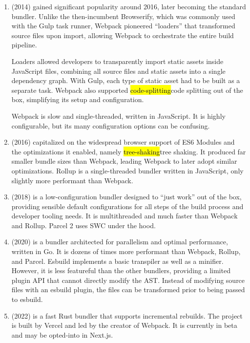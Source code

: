 \documentclass{article}
\begin{document}
\begin{enumerate}
  \item \href{https://webpack.js.org/}{} (2014) gained significant popularity around
    2016, later becoming the standard bundler. Unlike the then-incumbent Browserify, which was
    commonly used with the Gulp task runner, Webpack pioneered ``loaders'' that transformed source
    files upon import, allowing Webpack to orchestrate the entire build pipeline.

    Loaders allowed developers to transparently import static assets inside JavaScript files,
    combining all source files and static assets into a single dependency graph. With Gulp, each
    type of static asset had to be built as a separate task. Webpack also supported
    \hl{code-splitting}{code splitting} out of the box, simplifying its setup and configuration.

    Webpack is slow and single-threaded, written in JavaScript. It is highly configurable, but its
    many configuration options can be confusing.

  \item \href{https://rollupjs.org/}{} (2016) capitalized on the widespread browser
    support of ES6 Modules and the optimizations it enabled, namely \hl{tree-shaking}{tree shaking}.
    It produced far smaller bundle sizes than Webpack, leading Webpack to later adopt similar
    optimizations. Rollup is a single-threaded bundler written in JavaScript, only slightly more
    performant than Webpack.

  \item \href{https://parceljs.org/}{} (2018) is a low-configuration bundler designed to
    ``just work'' out of the box, providing sensible default configurations for all steps of the
    build process and developer tooling needs. It is multithreaded and much faster than Webpack and
    Rollup. Parcel 2 uses SWC under the hood.

  \item \href{https://esbuild.github.io/}{} (2020) is a bundler architected for
    parallelism and optimal performance, written in Go. It is dozens of times more performant than
    Webpack, Rollup, and Parcel. Esbuild implements a basic transpiler as well as a minifier.
    However, it is less featureful than the other bundlers, providing a limited plugin API that
    cannot directly modify the AST. Instead of modifying source files with an esbuild plugin, the
    files can be transformed prior to being passed to esbuild.

  \item \href{https://turbo.build/pack}{} (2022) is a fast Rust bundler that supports
    incremental rebuilds. The project is built by Vercel and led by the creator of Webpack. It is
    currently in beta and may be opted-into in Next.js.
\end{enumerate}
\end{document}
